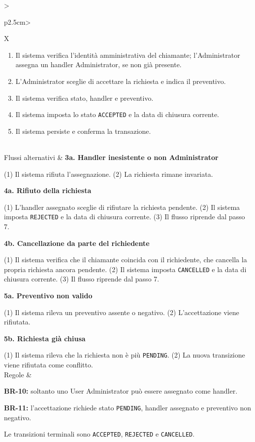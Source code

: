 \begin{tabularx}{\textwidth}{>{\raggedright\arraybackslash\sffamily\bfseries\color{black!75}}p{2.5cm}>{\raggedright\arraybackslash}X}
\begin{minipage}[t]{\linewidth}
\begin{enumerate}[leftmargin=1.4em,nosep,label=\arabic*.]
\item Il sistema verifica l'identità amministrativa del chiamante; l'Administrator assegna un handler Administrator, se non già presente.
\item L'Administrator sceglie di accettare la richiesta e indica il preventivo.
\item Il sistema verifica stato, handler e preventivo.
\item Il sistema imposta lo stato \texttt{ACCEPTED} e la data di chiusura corrente.
\item Il sistema persiste e conferma la transazione.
\end{enumerate}\vspace{3pt}\end{minipage} \\[2pt] \hline
Flussi alternativi & \textbf{3a. Handler inesistente o non Administrator} \par (1) Il sistema rifiuta l'assegnazione. (2) La richiesta rimane invariata. \par\smallskip \textbf{4a. Rifiuto della richiesta} \par (1) L'handler assegnato sceglie di rifiutare la richiesta pendente. (2) Il sistema imposta \texttt{REJECTED} e la data di chiusura corrente. (3) Il flusso riprende dal passo 7. \par\smallskip \textbf{4b. Cancellazione da parte del richiedente} \par (1) Il sistema verifica che il chiamante coincida con il richiedente, che cancella la propria richiesta ancora pendente. (2) Il sistema imposta \texttt{CANCELLED} e la data di chiusura corrente. (3) Il flusso riprende dal passo 7. \par\smallskip \textbf{5a. Preventivo non valido} \par (1) Il sistema rileva un preventivo assente o negativo. (2) L'accettazione viene rifiutata. \par\smallskip \textbf{5b. Richiesta già chiusa} \par (1) Il sistema rileva che la richiesta non è più \texttt{PENDING}. (2) La nuova transizione viene rifiutata come conflitto. \\[2pt] \hline
Regole &\par\smallskip\textbullet{} \textbf{BR-10:} soltanto uno User Administrator può essere assegnato come handler.\par\smallskip\textbullet{} \textbf{BR-11:} l'accettazione richiede stato \texttt{PENDING}, handler assegnato e preventivo non negativo.\par\smallskip\textbullet{} Le transizioni terminali sono \texttt{ACCEPTED}, \texttt{REJECTED} e \texttt{CANCELLED}. \\[2pt] \hline

\end{tabularx}
